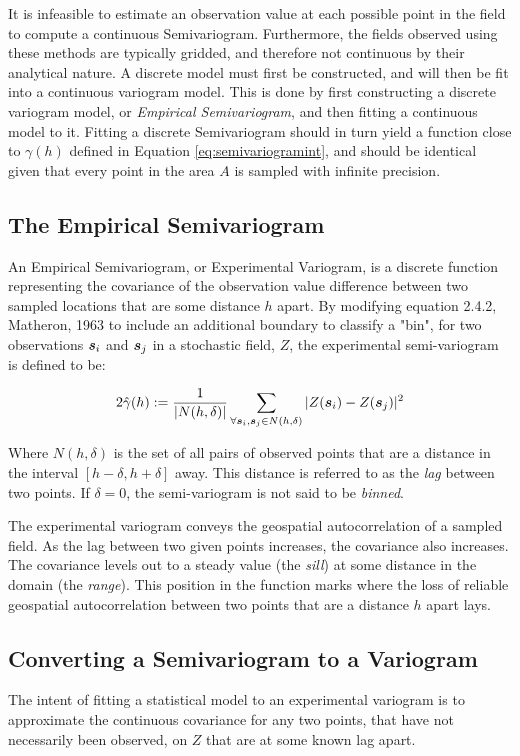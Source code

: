 It is infeasible to estimate an observation value at each possible point in the field to compute a continuous Semivariogram. Furthermore, the fields observed using these methods are typically gridded, and therefore not continuous by their analytical nature. A discrete model must first be constructed, and will then be fit into a continuous variogram model. This is done by first constructing a discrete variogram model, or \textit{Empirical Semivariogram}, and then fitting a continuous model to it. Fitting a discrete Semivariogram should in turn yield a function close to $\gamma(h)$ defined in Equation \ref{eq:semivariogramint}, and should be identical given that every point in the area $A$ is sampled with infinite precision.

\subsection{The Empirical Semivariogram}
An Empirical Semivariogram, or Experimental Variogram, is a discrete function representing the covariance of the observation value difference between two sampled locations that are some distance $h$ apart. By modifying equation 2.4.2, Matheron, 1963 \cite{matheron:geostat} to include an additional boundary to classify a "bin", for two observations ${\it{\boldsymbol{s}}}_{i}$ and ${\it{\boldsymbol{s}}}_{j}$ in a stochastic field, $Z$, the experimental semi-variogram is defined to be:

\begin{equation} 
    \label{eq:exp_var}
    2\hat{\gamma}(h) := \frac{1}{|N(h,\delta)|}\sum\limits_{\forall \vect{s}_i,\vect{s}_j \in N(h, \delta)}|Z(\vect{s}_i) - Z(\vect{s}_j)|^2 %
\end{equation}

Where $N(h,\delta)$ is the set of all pairs of observed points that are a distance in the interval $[h-\delta, h+\delta]$ away. This distance is referred to as the \textit{lag} between two points. If $\delta = 0$, the semi-variogram is not said to be \textit{binned}.

The experimental variogram conveys the geospatial autocorrelation of a sampled field. As the lag between two given points increases, the covariance also increases. The covariance levels out to a steady value (the \textit{sill}) at some distance in the domain (the \textit{range}). This position in the function marks where the loss of reliable geospatial autocorrelation between two points that are a distance $h$ apart lays.

\subsection{Converting a Semivariogram to a Variogram} \label{sec:semitovar}
The intent of fitting a statistical model to an experimental variogram is to approximate the continuous covariance for any two points, that have not necessarily been observed, on $Z$ that are at some known lag apart.

